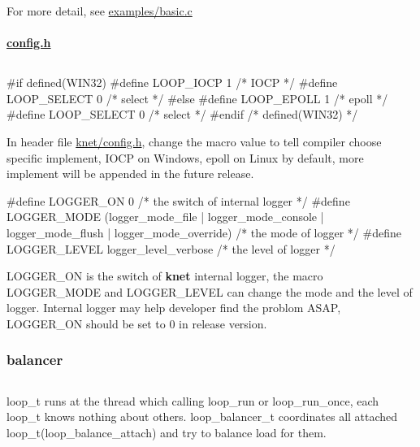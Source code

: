 For more detail, see {\ttfamily \hyperlink{basic_8c}{examples/basic.\+c}}

\paragraph*{\hyperlink{config_8h}{config.\+h}}

\subsection*{}

\begin{DoxyVerb}#if defined(WIN32)
    #define LOOP_IOCP 1    /* IOCP */
    #define LOOP_SELECT 0  /* select */
#else
    #define LOOP_EPOLL 1   /* epoll */
    #define LOOP_SELECT 0  /* select */
#endif /* defined(WIN32) */
\end{DoxyVerb}


In header file {\ttfamily \hyperlink{config_8h}{knet/config.\+h}}, change the macro value to tell compiler choose specific implement, I\+O\+C\+P on Windows, epoll on Linux by default, more implement will be appended in the future release. \begin{DoxyVerb}#define LOGGER_ON 0 /* the switch of internal logger */
#define LOGGER_MODE (logger_mode_file | logger_mode_console | logger_mode_flush | logger_mode_override) /* the mode of logger */
#define LOGGER_LEVEL logger_level_verbose /* the level of logger */
\end{DoxyVerb}


{\ttfamily L\+O\+G\+G\+E\+R\+\_\+\+O\+N} is the switch of {\bfseries knet} internal logger, the macro {\ttfamily L\+O\+G\+G\+E\+R\+\_\+\+M\+O\+D\+E} and {\ttfamily L\+O\+G\+G\+E\+R\+\_\+\+L\+E\+V\+E\+L} can change the mode and the level of logger. Internal logger may help developer find the problom A\+S\+A\+P, {\ttfamily L\+O\+G\+G\+E\+R\+\_\+\+O\+N} should be set to 0 in release version.

\subsubsection*{balancer}

\subsection*{}

{\ttfamily loop\+\_\+t} runs at the thread which calling {\ttfamily loop\+\_\+run} or {\ttfamily loop\+\_\+run\+\_\+once}, each {\ttfamily loop\+\_\+t} knows nothing about others. {\ttfamily loop\+\_\+balancer\+\_\+t} coordinates all attached {\ttfamily loop\+\_\+t}({\ttfamily loop\+\_\+balance\+\_\+attach}) and try to balance load for them.

